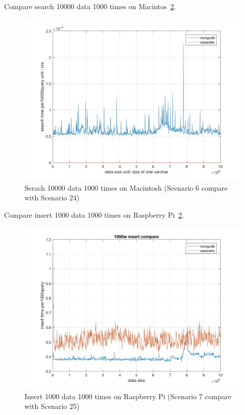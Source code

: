 Compare search 10000 data 1000 times on Macintos~\ref{f:fly}.

\begin{figure}[!ht]
  \centering\includegraphics[width=\columnwidth]
  {images/search_comp_10000.jpg}
  \caption{Serach 10000 data 1000 times on Macintosh
   (Scenario 6 compare with Scenario 24)}\label{f:fly}
\end{figure}



Compare insert 1000 data 1000 times on Raspberry Pi~\ref{f:fly}.

\begin{figure}[!ht]
  \centering\includegraphics[width=\columnwidth]
  {images/insert_comp_1000_pi.jpg}
  \caption{Insert 1000 data 1000 times on Raspberry Pi
   (Scenario 7 compare with Scenario 25) }\label{f:fly}
\end{figure}

